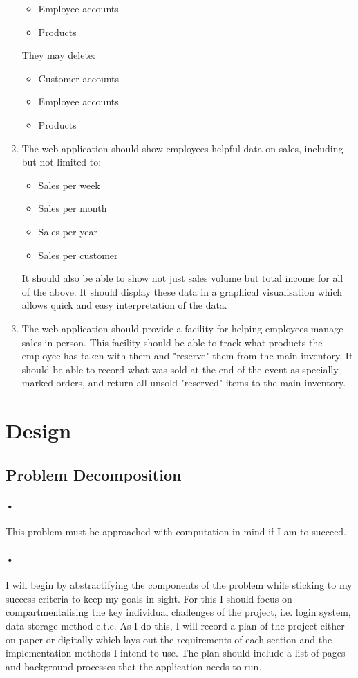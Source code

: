 ﻿\documentclass{article}
\begin{document}
\begin{enumerate}
\begin{itemize}
    \item Employee accounts
    \item Products
    \end{itemize}
    They may delete:
    \begin{itemize}
    \item Customer accounts
    \item Employee accounts
    \item Products
    \end{itemize}
    \item The web application should show employees helpful data on sales, including but not limited to:
    \begin{itemize}
    \item Sales per week
    \item Sales per month
    \item Sales per year
    \item Sales per customer
    \end{itemize}
    It should also be able to show not just sales volume but total income for all of the above. It should display these data in a graphical visualisation which allows quick and easy interpretation of the data.
    \item The web application should provide a facility for helping employees manage sales in person.
    This facility should be able to track what products the employee has taken with them and "reserve" them from the main inventory.
    It should be able to record what was sold at the end of the event as specially marked orders, and return all unsold "reserved" items to the main inventory.
    \end{enumerate}
    
    \section{Design}
    \subsection{Problem Decomposition}
    \paragraph{•}
    This problem must be approached with computation in mind if I am to succeed.
    \paragraph{•}
    I will begin by abstractifying the components of the problem while sticking to my success criteria to keep my goals in sight.
    For this I should focus on compartmentalising the key individual challenges of the project, i.e. login system, data storage method e.t.c.
    As I do this, I will record a plan of the project either on paper or digitally which lays out the requirements of each section and the implementation methods I intend to use.
    The plan should include a list of pages and background processes that the application needs to run.
\end{document}
